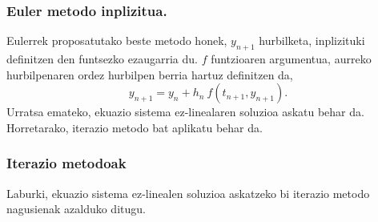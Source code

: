 \subsubsection*{Euler metodo inplizitua.}

Eulerrek proposatutako beste metodo honek, $y_{n+1}$ hurbilketa, inplizituki definitzen den funtsezko ezaugarria du. $f$ funtzioaren argumentua, aurreko hurbilpenaren ordez hurbilpen berria hartuz definitzen da,
\begin{equation*}
 \label{eq:202b}
y_{n+1}=y_{n}+h_n \ f(t_{n+1},y_{n+1}).
\end{equation*}
Urratsa emateko, ekuazio sistema ez-linealaren soluzioa askatu behar da. Horretarako, iterazio metodo bat aplikatu behar da.

\subsubsection*{Iterazio metodoak}

Laburki, ekuazio sistema ez-linealen soluzioa askatzeko bi iterazio metodo nagusienak azalduko ditugu.

